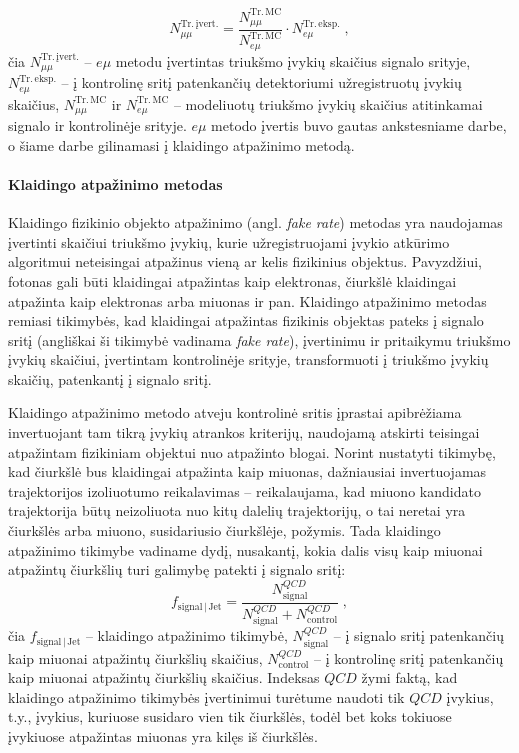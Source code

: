 \documentclass[a4paper, 12pt, oneside]{article}
\newcommand{\emu}{e\mu}
\newcommand{\QCD}{QC\! D}
\newlength\q
\begin{document}
\begin{equation}
	N_{\mu\mu}^{\mathrm{Tr. \, įvert.}} =
	\frac{ N_{\mu\mu}^{\mathrm{Tr. \, MC}} }{ N_{e\mu}^{\mathrm{Tr. \, MC}} }
	\cdot N_{e\mu}^{\mathrm{Tr. \, eksp.}} \; ,
	\label{eq:emuMethod}
\end{equation}
čia $N_{\mu\mu}^{\mathrm{Tr. \, įvert.}}$ -- $\emu$ metodu įvertintas triukšmo įvykių skaičius signalo srityje,
$N_{e\mu}^{\mathrm{Tr. \, eksp.}}$ -- į kontrolinę sritį patenkančių detektoriumi užregistruotų įvykių skaičius,
$N_{\mu\mu}^{\mathrm{Tr. \, MC}}$ ir $N_{e\mu}^{\mathrm{Tr. \, MC}}$ -- modeliuotų triukšmo įvykių skaičius
atitinkamai signalo ir kontrolinėje srityje.
$\emu$ metodo įvertis buvo gautas ankstesniame darbe, o šiame darbe gilinamasi į klaidingo atpažinimo metodą.

\paragraph{Klaidingo atpažinimo metodas\\}

Klaidingo fizikinio objekto atpažinimo (angl. \textit{fake rate}) metodas yra naudojamas įvertinti skaičiui triukšmo įvykių,
kurie užregistruojami įvykio atkūrimo algoritmui neteisingai atpažinus vieną ar kelis fizikinius objektus.
Pavyzdžiui, fotonas gali būti klaidingai atpažintas kaip elektronas, čiurkšlė klaidingai atpažinta kaip elektronas
arba miuonas ir pan.
Klaidingo atpažinimo metodas remiasi tikimybės, kad klaidingai atpažintas fizikinis objektas pateks į signalo sritį
(angliškai ši tikimybė vadinama \textit{fake rate}), įvertinimu ir pritaikymu triukšmo įvykių skaičiui, įvertintam
kontrolinėje srityje, transformuoti į triukšmo įvykių skaičių, patenkantį į signalo sritį.

Klaidingo atpažinimo metodo atveju kontrolinė sritis įprastai apibrėžiama invertuojant tam tikrą įvykių atrankos kriterijų, naudojamą
atskirti teisingai atpažintam fizikiniam objektui nuo atpažinto blogai.
Norint nustatyti tikimybę, kad čiurkšlė bus klaidingai atpažinta kaip miuonas, dažniausiai invertuojamas trajektorijos izoliuotumo
reikalavimas -- reikalaujama, kad miuono kandidato trajektorija būtų neizoliuota nuo kitų dalelių trajektorijų, o tai neretai yra
čiurkšlės arba miuono, susidariusio čiurkšlėje, požymis.
Tada klaidingo atpažinimo tikimybe vadiname dydį, nusakantį, kokia dalis visų kaip miuonai atpažintų čiurkšlių turi galimybę patekti
į signalo sritį:
\begin{equation} \label{eq:FR}
	f_{\mathrm{signal} \,| \,\mathrm{Jet}} =
	\frac{N^{\QCD}_{\mathrm{signal}}}{N^{\QCD}_{\mathrm{signal}}+N^{\QCD}_{\mathrm{control}}} \; ,
\end{equation}
čia $f_{\mathrm{signal} \,| \,\mathrm{Jet}}$ -- klaidingo atpažinimo tikimybė, $N^{\QCD}_{\mathrm{signal}}$ -- į signalo sritį
patenkančių kaip miuonai atpažintų čiurkšlių skaičius, $N^{\QCD}_{\mathrm{control}}$ -- į kontrolinę sritį patenkančių kaip miuonai
atpažintų čiurkšlių skaičius.
Indeksas $\QCD$ žymi faktą, kad klaidingo atpažinimo tikimybės įvertinimui turėtume naudoti tik $\QCD$ įvykius, t.y., įvykius,
kuriuose susidaro vien tik čiurkšlės, todėl bet koks tokiuose įvykiuose atpažintas miuonas yra kilęs iš čiurkšlės.
\end{document}
